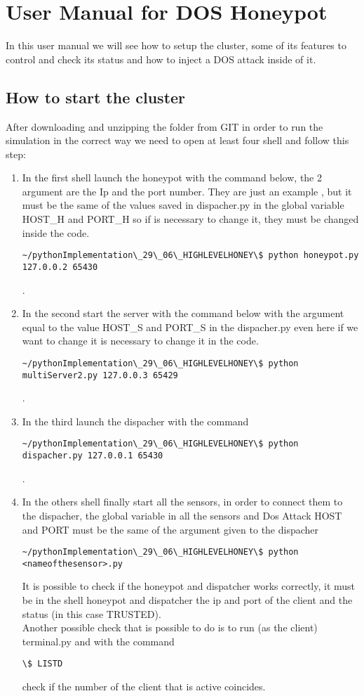 \chapter{User Manual for DOS Honeypot}
\label{usermanual}
In this user manual we will see how to setup the cluster, some of its features to control and check its status and how to inject a DOS attack inside of it.
\section{How to start the cluster}
After downloading and unzipping the folder from GIT in order to run the simulation in the correct way we need to open at least four shell and follow this step:
\begin{enumerate}
\item  In the first shell launch the honeypot  with the command below, the 2 argument are the Ip and the port number. They are just an example , but it must be the same of the values saved in dispacher.py in the global variable HOST\_H and PORT\_H  so if is necessary to change it, they must be changed inside the code. \begin{verbatim}~/pythonImplementation\_29\_06\_HIGHLEVELHONEY\$ python honeypot.py 127.0.0.2 65430\end{verbatim}. 
\item In the second start the server with the command below with the argument equal to the value HOST\_S and PORT\_S in the dispacher.py even here if we want to change it is necessary to change it in the code.  \begin{verbatim}~/pythonImplementation\_29\_06\_HIGHLEVELHONEY\$ python multiServer2.py 127.0.0.3 65429\end{verbatim}.
\item In the third launch the dispacher with the command  \begin{verbatim}~/pythonImplementation\_29\_06\_HIGHLEVELHONEY\$ python dispacher.py 127.0.0.1 65430\end{verbatim}. 
\item In the others shell finally start all the sensors, in order to connect them to the dispacher, the global variable in all the sensors and Dos Attack HOST and PORT must be the same of the argument given to the dispacher  \begin{verbatim}~/pythonImplementation\_29\_06\_HIGHLEVELHONEY\$ python <nameofthesensor>.py\end{verbatim}
It is possible to check if the honeypot and dispatcher works correctly, it must be in the shell honeypot and dispatcher the ip and port of the client and the status (in this case TRUSTED).\\
Another possible check that is possible to do is to run (as the client) terminal.py and with the command \begin{verbatim}\$ LISTD\end{verbatim} check if the number of the client that is active coincides.
\end{enumerate}
